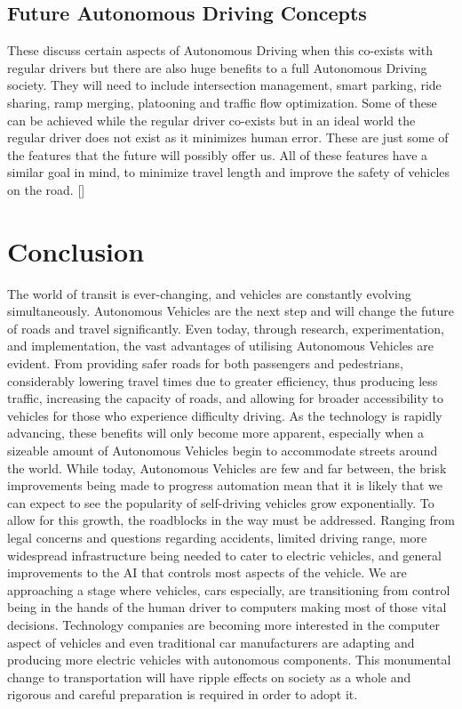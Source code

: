 \documentclass{article}
\begin{document}
\subsection{Future Autonomous Driving Concepts}

These discuss certain aspects of Autonomous Driving when this co-exists with regular drivers but there are also huge benefits to a full Autonomous Driving society. They will need to include intersection management, smart parking, ride sharing, ramp merging, platooning and traffic flow optimization. Some of these can be achieved while the regular driver co-exists but in an ideal world the regular driver does not exist as it minimizes human error. These are just some of the features that the future will possibly offer us. All of these features have a similar goal in mind, to minimize travel length and improve the safety of vehicles on the road. [\textcite{mariani2021coordination}]

\section{Conclusion}
The world of transit is ever-changing, and vehicles are constantly evolving simultaneously. Autonomous Vehicles are the next step and will change the future of roads and travel significantly. Even today, through research, experimentation, and implementation, the vast advantages of utilising Autonomous Vehicles are evident. From providing safer roads for both passengers and pedestrians, considerably lowering travel times due to greater efficiency, thus producing less traffic, increasing the capacity of roads, and allowing for broader accessibility to vehicles for those who experience difficulty driving. As the technology is rapidly advancing, these benefits will only become more apparent, especially when a sizeable amount of Autonomous Vehicles begin to accommodate streets around the world. While today, Autonomous Vehicles are few and far between, the brisk improvements being made to progress automation mean that it is likely that we can expect to see the popularity of self-driving vehicles grow exponentially. To allow for this growth, the roadblocks in the way must be addressed. Ranging from legal concerns and questions regarding accidents, limited driving range, more widespread infrastructure being needed to cater to electric vehicles, and general improvements to the AI that controls most aspects of the vehicle.
\bigbreak
We are approaching a stage where vehicles, cars especially, are transitioning from control being in the hands of the human driver to computers making most of those vital decisions. Technology companies are becoming more interested in the computer aspect of vehicles and even traditional car manufacturers are adapting and producing more electric vehicles with autonomous components. This monumental change to transportation will have ripple effects on society as a whole and rigorous and careful preparation is required in order to adopt it.

\printbibliography
\end{document}
